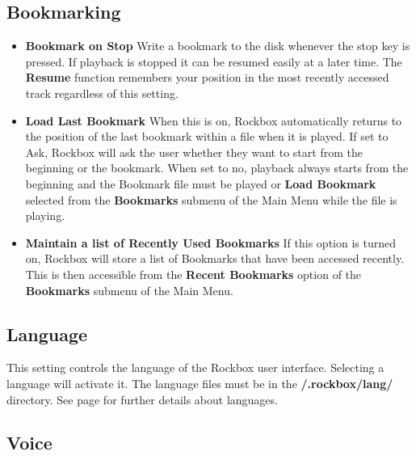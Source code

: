 \begin{itemize}
\end{itemize}

\subsection{\label{ref:Bookmarkconfigactual}Bookmarking}

\begin{itemize}
\item \textbf{Bookmark on Stop}
  Write a bookmark to the disk whenever the stop key is pressed.  If playback is stopped it can be resumed easily at a later time. The \textbf{Resume} function remembers your position in the most recently accessed track regardless of this setting.
\item \textbf{Load Last Bookmark}
  When this is on, Rockbox automatically returns to the position of the last bookmark within a file when it is played.  If set to Ask, Rockbox will ask the user whether they want to start from the beginning or the bookmark.  When set to no, playback always starts from the beginning and the Bookmark file must be played or \textbf{Load Bookmark} selected from the \textbf{Bookmarks} submenu of the Main Menu while the file is playing.
\item \textbf{Maintain a list of Recently Used Bookmarks}
  If this option is turned on, Rockbox will store a list of Bookmarks that have been accessed recently.  This is then accessible from the \textbf{Recent Bookmarks} option of the \textbf{Bookmarks} submenu of the Main Menu.
\end{itemize}

\subsection{\label{ref:Language}Language}
This setting controls the language of the Rockbox user interface. Selecting  a language will activate it. The language files must be in the \textbf{/.rockbox/lang/} directory. See page \pageref{ref:Loadinglanguages} for further details about languages.

\subsection{Voice}

